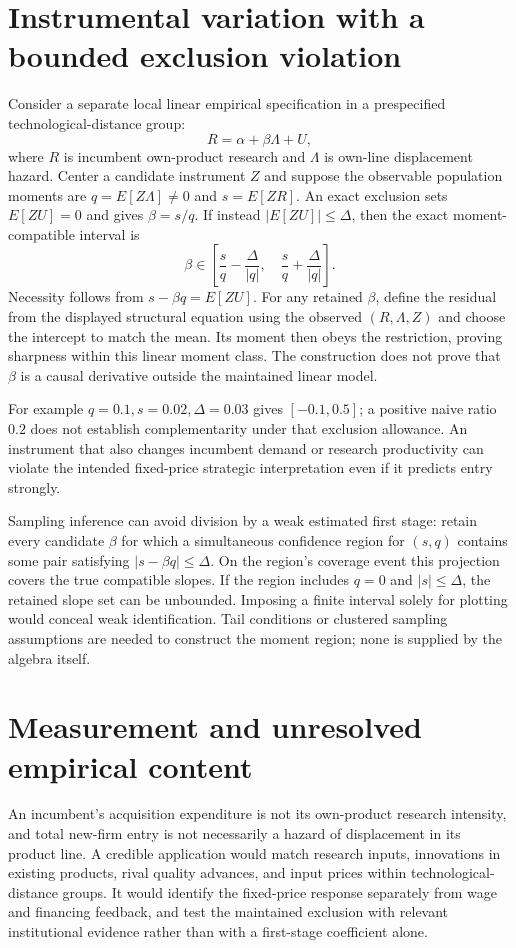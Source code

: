 \documentclass[11pt,a4paper]{article}
\begin{document}
\section{Instrumental variation with a bounded exclusion violation}
Consider a separate local linear empirical specification in a prespecified technological-distance group:
\[
 R=\alpha+\beta\Lambda+U,
\]
where $R$ is incumbent own-product research and $\Lambda$ is own-line displacement hazard. Center a candidate instrument $Z$ and suppose the observable population moments are
$q=E[Z\Lambda]\ne0$ and $s=E[ZR]$. An exact exclusion sets $E[ZU]=0$ and gives $\beta=s/q$. If instead $|E[ZU]|\le\Delta$, then the exact moment-compatible interval is
\[
 \beta\in\left[\frac sq-\frac{\Delta}{|q|},\quad
                    \frac sq+\frac{\Delta}{|q|}\right].   \tag{8}
\]
Necessity follows from $s-\beta q=E[ZU]$. For any retained $\beta$, define the residual from the displayed structural equation using the observed $(R,\Lambda,Z)$ and choose the intercept to match the mean. Its moment then obeys the restriction, proving sharpness within this linear moment class. The construction does not prove that $\beta$ is a causal derivative outside the maintained linear model.

For example $q=0.1,s=0.02,\Delta=0.03$ gives $[-0.1,0.5]$; a positive naive ratio $0.2$ does not establish complementarity under that exclusion allowance. An instrument that also changes incumbent demand or research productivity can violate the intended fixed-price strategic interpretation even if it predicts entry strongly.

Sampling inference can avoid division by a weak estimated first stage: retain every candidate $\beta$ for which a simultaneous confidence region for $(s,q)$ contains some pair satisfying $|s-\beta q|\le\Delta$. On the region's coverage event this projection covers the true compatible slopes. If the region includes $q=0$ and $|s|\le\Delta$, the retained slope set can be unbounded. Imposing a finite interval solely for plotting would conceal weak identification. Tail conditions or clustered sampling assumptions are needed to construct the moment region; none is supplied by the algebra itself.

\section{Measurement and unresolved empirical content}
An incumbent's acquisition expenditure is not its own-product research intensity, and total new-firm entry is not necessarily a hazard of displacement in its product line. A credible application would match research inputs, innovations in existing products, rival quality advances, and input prices within technological-distance groups. It would identify the fixed-price response separately from wage and financing feedback, and test the maintained exclusion with relevant institutional evidence rather than with a first-stage coefficient alone.
\end{document}
